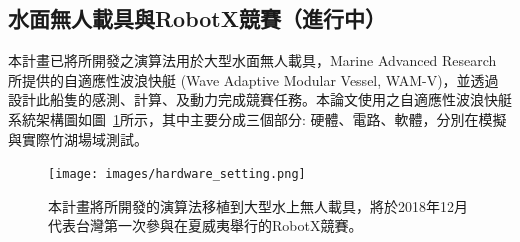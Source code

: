 \subsection{水面無人載具與RobotX競賽（進行中）}

本計畫已將所開發之演算法用於大型水面無人載具，Marine Advanced Research 所提供的自適應性波浪快艇 (Wave Adaptive Modular Vessel, WAM-V)，並透過設計此船隻的感測、計算、及動力完成競賽任務。本論文使用之自適應性波浪快艇系統架構圖如圖~\ref{figure:system_diagram}所示，其中主要分成三個部分: 硬體、電路、軟體，分別在模擬與實際竹湖場域測試。

\begin{figure}[bht]
	\centering
	\texttt{[image: images/hardware\_setting.png]}
	\caption{本計畫將所開發的演算法移植到大型水上無人載具，將於2018年12月代表台灣第一次參與在夏威夷舉行的RobotX競賽。}
	\label{figure:system_diagram}
\end{figure}


